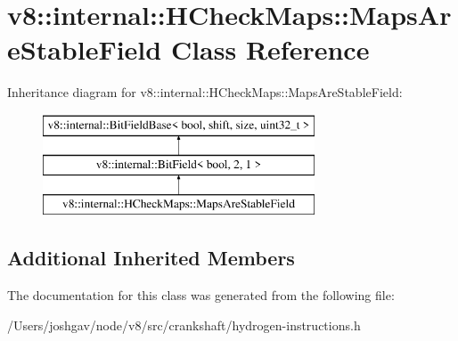 \hypertarget{classv8_1_1internal_1_1_h_check_maps_1_1_maps_are_stable_field}{}\section{v8\+:\+:internal\+:\+:H\+Check\+Maps\+:\+:Maps\+Are\+Stable\+Field Class Reference}
\label{classv8_1_1internal_1_1_h_check_maps_1_1_maps_are_stable_field}
Inheritance diagram for v8\+:\+:internal\+:\+:H\+Check\+Maps\+:\+:Maps\+Are\+Stable\+Field\+:\begin{figure}[H]
\begin{center}
\leavevmode
\includegraphics[height=3.000000cm]{classv8_1_1internal_1_1_h_check_maps_1_1_maps_are_stable_field}
\end{center}
\end{figure}
\subsection*{Additional Inherited Members}


The documentation for this class was generated from the following file\+:\begin{DoxyCompactItemize}
\item 
/\+Users/joshgav/node/v8/src/crankshaft/hydrogen-\/instructions.\+h\end{DoxyCompactItemize}
